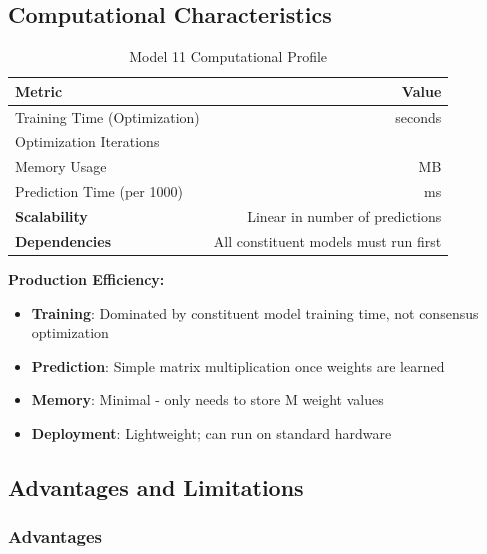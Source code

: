 \subsection{Computational Characteristics}

\begin{table}[ht]
\centering
\caption{Model 11 Computational Profile}
\label{tab:model11_computation}
\begin{tabular}{lr}
\toprule
\textbf{Metric} & \textbf{Value} \\
\midrule
Training Time (Optimization) & \ModelElevenTrainingTime{} seconds \\
Optimization Iterations & \ModelElevenOptimizationIters{} \\
Memory Usage & \ModelElevenMemoryUsage{} MB \\
Prediction Time (per 1000) & \ModelElevenPredictionTime{} ms \\
\midrule
\textbf{Scalability} & Linear in number of predictions \\
\textbf{Dependencies} & All constituent models must run first \\
\bottomrule
\end{tabular}
\end{table}

\textbf{Production Efficiency:}
\begin{itemize}
    \item \textbf{Training}: Dominated by constituent model training time, not consensus optimization
    \item \textbf{Prediction}: Simple matrix multiplication once weights are learned
    \item \textbf{Memory}: Minimal - only needs to store M weight values
    \item \textbf{Deployment}: Lightweight; can run on standard hardware
\end{itemize}

\subsection{Advantages and Limitations}

\subsubsection{Advantages}

